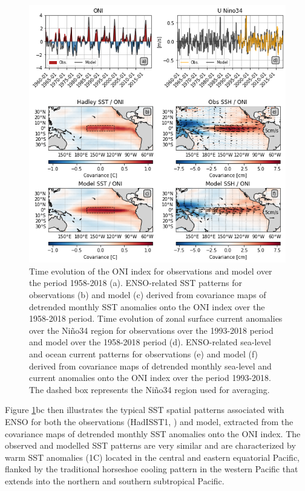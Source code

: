 \begin{figure}[h!tp]
	\centering
	\includegraphics[scale=0.6]{figs/fig1.png}
	\caption{Time evolution of the ONI index for observations and model over the period 1958-2018 (a). ENSO-related SST patterns for observations \citep{raynerGlobalAnalysesSea2003} (b) and model (c) derived from covariance maps of detrended monthly SST anomalies onto the ONI index over the 1958-2018 period. Time evolution of zonal surface current anomalies over the Niño34 region for observations over the 1993-2018 period \citep{rioGOCEOceanCirculation2014} and model over the 1958-2018 period (d). ENSO-related sea-level and ocean current patterns for observations (e) and model (f) derived from covariance maps of detrended monthly sea-level and current anomalies onto the ONI index over the period 1993-2018. The dashed box represents the Niño34 region used for averaging.}
	\label{fig:nemo-had-sst}
\end{figure}

Figure \ref{fig:nemo-had-sst}bc then illustrates the typical SST spatial patterns associated with ENSO for both the observations (HadISST1, \citealp{raynerGlobalAnalysesSea2003}) and model, extracted from the covariance maps of detrended monthly SST anomalies onto the ONI index. The observed and modelled SST patterns are very similar and are characterized by warm SST anomalies (1\degree{}C) located in the central and eastern equatorial Pacific, flanked by the traditional horseshoe cooling pattern in the western Pacific that extends into the northern and southern subtropical Pacific.    



